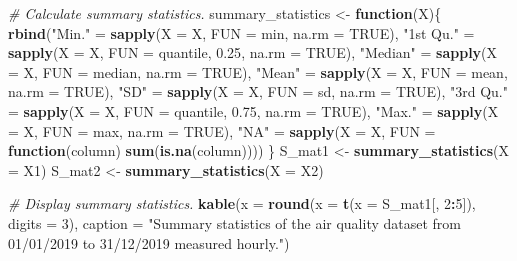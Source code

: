 \documentclass[
]{article}
\newenvironment{Shaded}{\begin{snugshade}}{\end{snugshade}}
\newcommand{\AttributeTok}[1]{\textcolor[rgb]{0.13,0.29,0.53}{#1}}
\newcommand{\CommentTok}[1]{\textcolor[rgb]{0.56,0.35,0.01}{\textit{#1}}}
\newcommand{\ConstantTok}[1]{\textcolor[rgb]{0.56,0.35,0.01}{#1}}
\newcommand{\ControlFlowTok}[1]{\textcolor[rgb]{0.13,0.29,0.53}{\textbf{#1}}}
\newcommand{\DecValTok}[1]{\textcolor[rgb]{0.00,0.00,0.81}{#1}}
\newcommand{\FloatTok}[1]{\textcolor[rgb]{0.00,0.00,0.81}{#1}}
\newcommand{\FunctionTok}[1]{\textcolor[rgb]{0.13,0.29,0.53}{\textbf{#1}}}
\newcommand{\NormalTok}[1]{#1}
\newcommand{\OtherTok}[1]{\textcolor[rgb]{0.56,0.35,0.01}{#1}}
\newcommand{\SpecialCharTok}[1]{\textcolor[rgb]{0.81,0.36,0.00}{\textbf{#1}}}
\newcommand{\StringTok}[1]{\textcolor[rgb]{0.31,0.60,0.02}{#1}}
\begin{document}
\begin{Shaded}
\begin{Highlighting}[]
\CommentTok{\# Calculate summary statistics.}
\NormalTok{summary\_statistics }\OtherTok{\textless{}{-}} \ControlFlowTok{function}\NormalTok{(X)\{}
   \FunctionTok{rbind}\NormalTok{(}\StringTok{"Min."} \OtherTok{=} \FunctionTok{sapply}\NormalTok{(}\AttributeTok{X =}\NormalTok{ X, }\AttributeTok{FUN =}\NormalTok{ min, }\AttributeTok{na.rm =} \ConstantTok{TRUE}\NormalTok{),}
         \StringTok{"1st Qu."} \OtherTok{=} \FunctionTok{sapply}\NormalTok{(}\AttributeTok{X =}\NormalTok{ X, }\AttributeTok{FUN =}\NormalTok{ quantile, }\FloatTok{0.25}\NormalTok{, }\AttributeTok{na.rm =} \ConstantTok{TRUE}\NormalTok{),}
         \StringTok{"Median"} \OtherTok{=} \FunctionTok{sapply}\NormalTok{(}\AttributeTok{X =}\NormalTok{ X, }\AttributeTok{FUN =}\NormalTok{ median, }\AttributeTok{na.rm =} \ConstantTok{TRUE}\NormalTok{),}
         \StringTok{"Mean"} \OtherTok{=} \FunctionTok{sapply}\NormalTok{(}\AttributeTok{X =}\NormalTok{ X, }\AttributeTok{FUN =}\NormalTok{ mean, }\AttributeTok{na.rm =} \ConstantTok{TRUE}\NormalTok{),}
         \StringTok{"SD"} \OtherTok{=} \FunctionTok{sapply}\NormalTok{(}\AttributeTok{X =}\NormalTok{ X, }\AttributeTok{FUN =}\NormalTok{ sd, }\AttributeTok{na.rm =} \ConstantTok{TRUE}\NormalTok{),}
         \StringTok{"3rd Qu."} \OtherTok{=} \FunctionTok{sapply}\NormalTok{(}\AttributeTok{X =}\NormalTok{ X, }\AttributeTok{FUN =}\NormalTok{ quantile, }\FloatTok{0.75}\NormalTok{, }\AttributeTok{na.rm =} \ConstantTok{TRUE}\NormalTok{),}
         \StringTok{"Max."} \OtherTok{=} \FunctionTok{sapply}\NormalTok{(}\AttributeTok{X =}\NormalTok{ X, }\AttributeTok{FUN =}\NormalTok{ max, }\AttributeTok{na.rm =} \ConstantTok{TRUE}\NormalTok{),}
         \StringTok{"NA"} \OtherTok{=} \FunctionTok{sapply}\NormalTok{(}\AttributeTok{X =}\NormalTok{ X, }\AttributeTok{FUN =} \ControlFlowTok{function}\NormalTok{(column) }\FunctionTok{sum}\NormalTok{(}\FunctionTok{is.na}\NormalTok{(column))))}
\NormalTok{\}}
\NormalTok{S\_mat1 }\OtherTok{\textless{}{-}} \FunctionTok{summary\_statistics}\NormalTok{(}\AttributeTok{X =}\NormalTok{ X1)}
\NormalTok{S\_mat2 }\OtherTok{\textless{}{-}} \FunctionTok{summary\_statistics}\NormalTok{(}\AttributeTok{X =}\NormalTok{ X2)}

\CommentTok{\# Display summary statistics.}
\FunctionTok{kable}\NormalTok{(}\AttributeTok{x =} \FunctionTok{round}\NormalTok{(}\AttributeTok{x =} \FunctionTok{t}\NormalTok{(}\AttributeTok{x =}\NormalTok{ S\_mat1[, }\DecValTok{2}\SpecialCharTok{:}\DecValTok{5}\NormalTok{]), }\AttributeTok{digits =} \DecValTok{3}\NormalTok{), }
        \AttributeTok{caption =} \StringTok{"Summary statistics of the air quality dataset from 01/01/2019 to 31/12/2019 measured hourly."}\NormalTok{)}


\end{Highlighting}
\end{Shaded}
\end{document}
